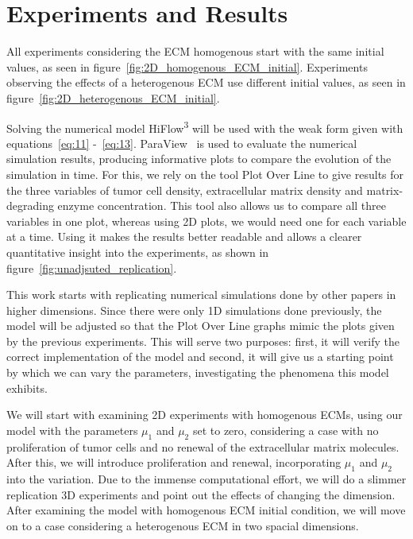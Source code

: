 

\section{Experiments and Results}
\label{sec:experiments}

All experiments considering the ECM homogenous start with the same initial values, as seen in figure~\ref{fig:2D_homogenous_ECM_initial}. Experiments observing the effects of a heterogenous ECM use different initial values, as seen in figure~\ref{fig:2D_heterogenous_ECM_initial}.

Solving the numerical model HiFlow\textsuperscript{3}\cite{hiflow3} will be used with the weak form given with equations~\ref{eq:11} -~\ref{eq:13}. ParaView~\cite{paraview} is used to evaluate the numerical simulation results, producing informative plots to compare the evolution of the simulation in time. For this, we rely on the tool Plot Over Line to give results for the three variables of tumor cell density, extracellular matrix density and matrix-degrading enzyme concentration. This tool also allows us to compare all three variables in one plot, whereas using 2D plots, we would need one for each variable at a time. Using it makes the results better readable and allows a clearer quantitative insight into the experiments, as shown in figure~\ref{fig:unadjsuted_replication}.

This work starts with replicating numerical simulations done by other papers in higher dimensions. Since there were only 1D simulations done previously, the model will be adjusted so that the Plot Over Line graphs mimic the plots given by the previous experiments. This will serve two purposes: first, it will verify the correct implementation of the model and second, it will give us a starting point by which we can vary the parameters, investigating the phenomena this model exhibits.

We will start with examining 2D experiments with homogenous ECMs, using our model with the parameters $\mu_1$ and $\mu_2$ set to zero, considering a case with no proliferation of tumor cells and no renewal of the extracellular matrix molecules. After this, we will introduce proliferation and renewal, incorporating $\mu_1$ and $\mu_2$ into the variation.
Due to the immense computational effort, we will do a slimmer replication 3D experiments and point out the effects of changing the dimension. After examining the model with homogenous ECM initial condition, we will move on to a case considering a heterogenous ECM in two spacial dimensions.

